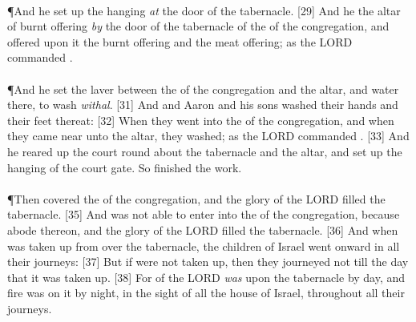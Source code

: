 \\
\P \textcolor[cmyk]{0.99998,1,0,0}{And he set up the hanging \emph{at} the door of the tabernacle.}
[29] \textcolor[cmyk]{0.99998,1,0,0}{And he  the altar of burnt offering \emph{by} the door of the tabernacle of the  of the congregation, and offered upon it the burnt offering and the meat offering; as the LORD commanded .}\\
\\
\P \textcolor[cmyk]{0.99998,1,0,0}{And he set the laver between the  of the congregation and the altar, and  water there, to wash \emph{withal}.}
[31] \textcolor[cmyk]{0.99998,1,0,0}{And  and Aaron and his sons washed their hands and their feet thereat:}
[32] \textcolor[cmyk]{0.99998,1,0,0}{When they went into the  of the congregation, and when they came near unto the altar, they washed; as the LORD commanded .}
[33] \textcolor[cmyk]{0.99998,1,0,0}{And he reared up the court round about the tabernacle and the altar, and set up the hanging of the court gate. So  finished the work.}\\
\\
\P \textcolor[cmyk]{0.99998,1,0,0}{Then  covered the  of the congregation, and the glory of the LORD filled the tabernacle.}
[35] \textcolor[cmyk]{0.99998,1,0,0}{And  was not able to enter into the  of the congregation, because  abode thereon, and the glory of the LORD filled the tabernacle.}
[36] \textcolor[cmyk]{0.99998,1,0,0}{And when  was taken up from over the tabernacle, the children of Israel went onward in all their journeys:}
[37] \textcolor[cmyk]{0.99998,1,0,0}{But if  were not taken up, then they journeyed not till the day that it was taken up.}
[38] \textcolor[cmyk]{0.99998,1,0,0}{For  of the LORD \emph{was} upon the tabernacle by day, and fire was on it by night, in the sight of all the house of Israel, throughout all their journeys.}